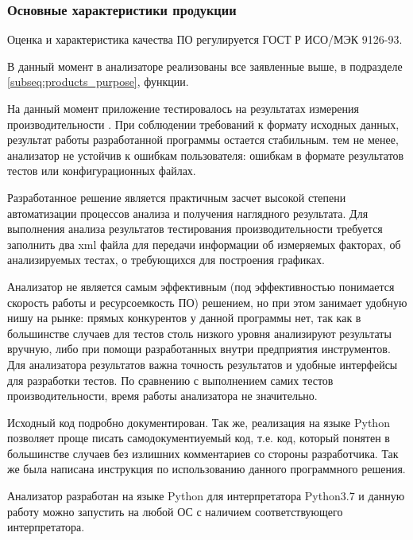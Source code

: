 \subsubsection{Основные характеристики продукции}
	Оценка и характеристика качества ПО регулируется ГОСТ Р ИСО/МЭК 9126-93.
	\begin{description}[noitemsep]
		\item[Функциональные возможности.] 
			В данный момент в анализаторе реализованы все заявленные выше, в подразделе \ref{subseq:products_purpose}, функции.
		\item[Надежность.] 
			На данный момент приложение тестировалось на результатах измерения производительности \marm{}. При соблюдении требований к формату исходных данных, результат работы разработанной программы остается стабильным. тем не менее, анализатор не устойчив к ошибкам пользователя: ошибкам в формате результатов тестов или конфигурационных файлах.
		\item[Практичность.]
			Разработанное решение является практичным засчет высокой степени автоматизации процессов анализа и получения наглядного результата. Для выполнения анализа результатов тестирования производительности требуется заполнить два xml файла для передачи информации об измеряемых факторах, об анализируемых тестах, о требующихся для построения графиках.
		\item[Эффективность.]
			Анализатор не является самым эффективным (под эффективностью понимается скорость работы и ресурсоемкость ПО) решением, но при этом занимает удобную нишу на рынке: прямых конкурентов у данной программы нет, так как в большинстве случаев для тестов столь низкого уровня анализируют результаты вручную, либо при помощи разработанных внутри предприятия инструментов. Для анализатора результатов важна точность результатов и удобные интерфейсы для разработки тестов. По сравнению с выполнением самих тестов производительности, время работы анализатора не значительно.
		\item[Сопровождаемость.]
			Исходный код подробно документирован. Так же, реализация на языке Python позволяет проще писать самодокументиуемый код, т.е. код, который понятен в большинстве случаев без излишних комментариев со стороны разработчика. Так же была написана инструкция по использованию данного программного решения.
		\item[Мобильность.]
			Анализатор разработан на языке Python для интерпретатора Python3.7 и данную работу можно запустить на любой ОС с наличием соответствующего интерпретатора.
	\end{description}

